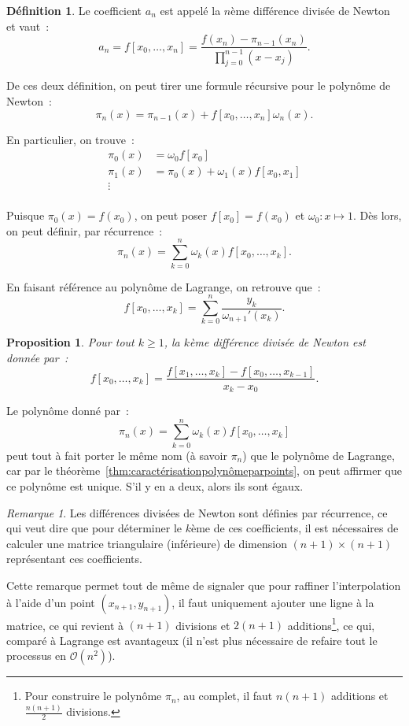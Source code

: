 \documentclass{article}
\newtheorem{prp}[thm]{Proposition}
\theoremstyle{definition}
\newtheorem{déf}[thm]{Définition}
\theoremstyle{remark}
\newtheorem*{rmq}{Remarque}
\begin{document}
		\begin{déf} Le coefficient $a_n$ est appelé la $n$ème différence divisée de Newton et vaut~:
		\[a_n = f[x_0, \dotsc, x_n] = \frac {f(x_n)-\pi_{n-1}(x_n)}{\prod_{j=0}^{n-1}(x-x_j)}.\]
		\end{déf}

		De ces deux définition, on peut tirer une formule récursive pour le polynôme de Newton~:
		\[\pi_n(x) = \pi_{n-1}(x) + f[x_0, \dotsc, x_n]\omega_n(x).\]

		En particulier, on trouve~:
		\begin{align*}
			\pi_0(x) &= \omega_0f[x_0] \\
			\pi_1(x) &= \pi_0(x) + \omega_1(x)f[x_0, x_1] \\
			\vdots \\
		\end{align*}

		Puisque $\pi_0(x) = f(x_0)$, on peut poser $f[x_0] = f(x_0)$ et $\omega_0 : x \mapsto 1$. Dès lors, on peut définir, par récurrence~:
		\[\pi_n(x) = \sum_{k=0}^n\omega_k(x)f[x_0, \dotsc, x_k].\]

		En faisant référence au polynôme de Lagrange, on retrouve que~:
		\[f[x_0, \dotsc, x_k] = \sum_{k=0}^n\frac {y_k}{\omega_{n+1}'(x_k)}.\]

		\begin{prp} Pour tout $k \geq 1$, la $k$ème différence divisée de Newton est donnée par~:
		\[f[x_0, \dotsc, x_k] = \frac {f[x_1, \dotsc, x_k] - f[x_0, \dotsc, x_{k-1}]}{x_k-x_0}.\]
		\end{prp}

		Le polynôme donné par~:
		\[\pi_n(x) = \sum_{k=0}^n\omega_k(x)f[x_0, \dotsc, x_k]\]
		peut tout à fait porter le même nom (à savoir $\pi_n$) que le polynôme de Lagrange, car par le théorème~\ref{thm:caractérisationpolynômeparpoints}, on
		peut affirmer que ce polynôme est unique. S'il y en a deux, alors ils sont égaux.

		\begin{rmq} Les différences divisées de Newton sont définies par récurrence, ce qui veut dire que pour déterminer le $k$ème de ces coefficients, il
		est nécessaires de calculer une matrice triangulaire (inférieure) de dimension $(n+1) \times (n+1)$ représentant ces coefficients.
		\end{rmq}

		Cette remarque permet tout de même de signaler que pour raffiner l'interpolation à l'aide d'un point $(x_{n+1}, y_{n+1})$, il faut uniquement ajouter
		une ligne à la matrice, ce qui revient à $(n+1)$ divisions et $2(n+1)$ additions\footnote{Pour construire le polynôme $\pi_n$, au complet, il faut
		$n(n+1)$ additions et $\frac {n(n+1)}2$ divisions.}, ce qui, comparé à Lagrange est avantageux (il n'est plus nécessaire de refaire tout le processus
		en $\mathcal O(n^2)$).
\end{document}
